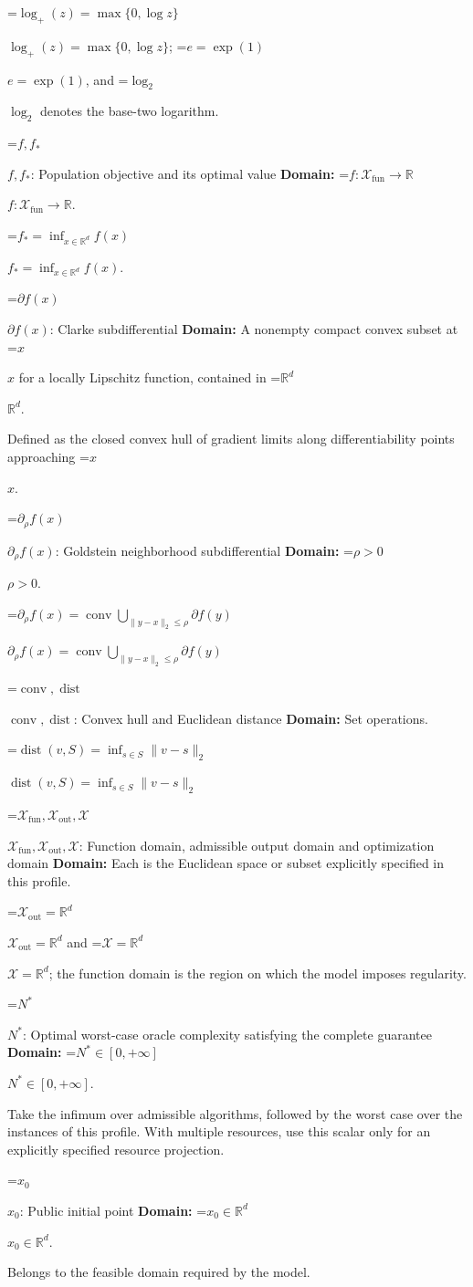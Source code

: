 \documentclass[10pt,a4paper]{article}
\newcommand{\AtlasMath}[1]{\par\begingroup\centering\setbox0=\hbox{$\displaystyle #1$}\ifdim\wd0>1.4\linewidth\typeout{ATLAS WIDE FORMULA: \the\wd0}\fi\ifdim\wd0>\linewidth\resizebox{\linewidth}{!}{\box0}\else\box0\fi\par\endgroup}
\newcommand{\AtlasInlineMath}[1]{\begingroup\setbox0=\hbox{$#1$}\ifdim\wd0>.4\linewidth\endgroup\AtlasMath{#1}\else\endgroup$#1$\fi}
\begin{document}
\AtlasInlineMath{\log_+(z)=\max\{0,\log z\}}; \AtlasInlineMath{e=\exp(1)}, and \AtlasInlineMath{\log_2} denotes the base-two logarithm.

\AtlasInlineMath{f,f_*}: Population objective and its optimal value \textbf{Domain:} \AtlasInlineMath{f:\mathcal{X}_{\mathrm{fun}}\to\mathbb{R}}.

\AtlasInlineMath{f_*=\inf_{x\in \mathbb{R}^d}f(x)}.

\AtlasInlineMath{\partial f(x)}: Clarke subdifferential \textbf{Domain:} A nonempty compact convex subset at \AtlasInlineMath{x} for a locally Lipschitz function, contained in \AtlasInlineMath{\mathbb{R}^d}.

Defined as the closed convex hull of gradient limits along differentiability points approaching \AtlasInlineMath{x}.

\AtlasInlineMath{\partial_\rho f(x)}: Goldstein neighborhood subdifferential \textbf{Domain:} \AtlasInlineMath{\rho>0}.

\AtlasInlineMath{\partial_\rho f(x)=\operatorname{conv}\bigcup_{\|y-x\|_2\le\rho}\partial f(y)}

\AtlasInlineMath{\operatorname{conv},\operatorname{dist}}: Convex hull and Euclidean distance \textbf{Domain:} Set operations.

\AtlasInlineMath{\operatorname{dist}(v,S)=\inf_{s\in S}\|v-s\|_2}

\AtlasInlineMath{\mathcal{X}_{\mathrm{fun}},\mathcal{X}_{\mathrm{out}},\mathcal{X}}: Function domain, admissible output domain and optimization domain \textbf{Domain:} Each is the Euclidean space or subset explicitly specified in this profile.

\AtlasInlineMath{\mathcal{X}_{\mathrm{out}}=\mathbb{R}^d} and \AtlasInlineMath{\mathcal{X}=\mathbb{R}^d}; the function domain is the region on which the model imposes regularity.

\AtlasInlineMath{N^*}: Optimal worst-case oracle complexity satisfying the complete guarantee \textbf{Domain:} \AtlasInlineMath{N^*\in[0,+\infty]}.

Take the infimum over admissible algorithms, followed by the worst case over the instances of this profile. With multiple resources, use this scalar only for an explicitly specified resource projection.

\AtlasInlineMath{x_0}: Public initial point \textbf{Domain:} \AtlasInlineMath{x_0\in\mathbb{R}^d}.

Belongs to the feasible domain required by the model.
\end{document}
